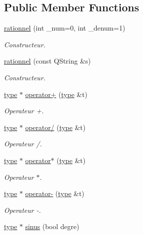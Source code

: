 \subsection*{Public Member Functions}
\begin{DoxyCompactItemize}
\item 
\hyperlink{classrationnel_a92b822d1a85e77456f9db2d0c691d74e}{rationnel} (int \-\_\-num=0, int \-\_\-denum=1)
\begin{DoxyCompactList}\small\item\em Constructeur. \end{DoxyCompactList}\item 
\hyperlink{classrationnel_a7411453ee0e517a0008e563938033750}{rationnel} (const Q\-String \&s)
\begin{DoxyCompactList}\small\item\em Constructeur. \end{DoxyCompactList}\item 
\hyperlink{classtype}{type} $\ast$ \hyperlink{classrationnel_a14d9d411058e146e075ccf16997e525e}{operator+} (\hyperlink{classtype}{type} \&t)
\begin{DoxyCompactList}\small\item\em Operateur +. \end{DoxyCompactList}\item 
\hyperlink{classtype}{type} $\ast$ \hyperlink{classrationnel_ae36b04407cc70d425ed0292975b0d1e9}{operator/} (\hyperlink{classtype}{type} \&t)
\begin{DoxyCompactList}\small\item\em Operateur /. \end{DoxyCompactList}\item 
\hyperlink{classtype}{type} $\ast$ \hyperlink{classrationnel_a49250cb9001aad230e5193515ee74efa}{operator$\ast$} (\hyperlink{classtype}{type} \&t)
\begin{DoxyCompactList}\small\item\em Operateur $\ast$. \end{DoxyCompactList}\item 
\hyperlink{classtype}{type} $\ast$ \hyperlink{classrationnel_a3bdf6de1a2526ddafbf1831a9af11dc9}{operator-\/} (\hyperlink{classtype}{type} \&t)
\begin{DoxyCompactList}\small\item\em Operateur -\/. \end{DoxyCompactList}\item 
\hyperlink{classtype}{type} $\ast$ \hyperlink{classrationnel_ad34af896f760a0271286e2dbbf55ad9f}{sinus} (bool degre)

\end{DoxyCompactItemize}
